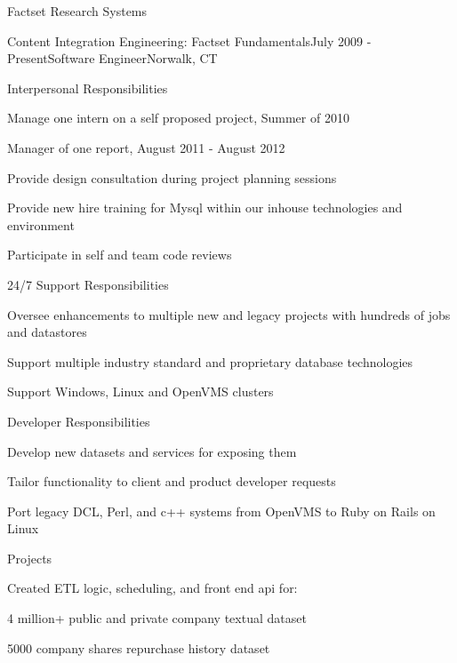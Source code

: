 \documentclass{resume} %
\begin{document}
\begin{rSection}{Factset Research Systems}
\begin{rSubsection}{Content Integration Engineering: Factset Fundamentals}{July 2009 - Present}{Software Engineer}{Norwalk, CT}
\setlength{\itemindent}{1em}
\item Interpersonal Responsibilities 
\setlength{\itemindent}{2em}
\item Manage one intern on a self proposed project, Summer of 2010
\item Manager of one report, August 2011 - August 2012
\item Provide design consultation during project planning sessions
\item Provide new hire training for Mysql within our inhouse technologies and environment
\item Participate in self and team code reviews
\setlength{\itemindent}{1em}
\item 24/7 Support Responsibilities 
\setlength{\itemindent}{2em}
\item Oversee enhancements to multiple new and legacy projects with hundreds of jobs and datastores
\item Support multiple industry standard and proprietary database technologies
\item Support Windows, Linux and OpenVMS clusters
\setlength{\itemindent}{1em}
\item Developer Responsibilities 
\setlength{\itemindent}{2em}
\item Develop new datasets and services for exposing them 
\item Tailor functionality to client and product developer requests
\item Port legacy DCL, Perl, and c++ systems from OpenVMS to Ruby on Rails on Linux
\setlength{\itemindent}{1em}
\item Projects 
\setlength{\itemindent}{2em}
\item Created ETL logic, scheduling, and front end api for:
\setlength{\itemindent}{3em}
\item 4 million+ public and private company textual dataset
\item 5000 company shares repurchase history dataset

\end{rSubsection}
\end{rSection}
\end{document}
